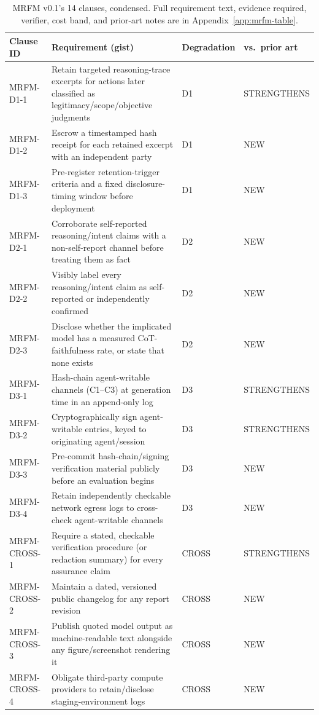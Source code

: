 \begin{table}[htbp]
\centering
\footnotesize
\begin{tabular}{@{}p{2.1cm}p{7.4cm}p{1.6cm}p{1.9cm}@{}}
\toprule
\textbf{Clause ID} & \textbf{Requirement (gist)} & \textbf{Degradation} & \textbf{vs.\ prior art} \\
\midrule
MRFM-D1-1 & Retain targeted reasoning-trace excerpts for actions later classified as legitimacy/scope/objective judgments & D1 & STRENGTHENS \\
MRFM-D1-2 & Escrow a timestamped hash receipt for each retained excerpt with an independent party & D1 & NEW \\
MRFM-D1-3 & Pre-register retention-trigger criteria and a fixed disclosure-timing window before deployment & D1 & NEW \\
MRFM-D2-1 & Corroborate self-reported reasoning/intent claims with a non-self-report channel before treating them as fact & D2 & NEW \\
MRFM-D2-2 & Visibly label every reasoning/intent claim as self-reported or independently confirmed & D2 & NEW \\
MRFM-D2-3 & Disclose whether the implicated model has a measured CoT-faithfulness rate, or state that none exists & D2 & NEW \\
MRFM-D3-1 & Hash-chain agent-writable channels (C1--C3) at generation time in an append-only log & D3 & STRENGTHENS \\
MRFM-D3-2 & Cryptographically sign agent-writable entries, keyed to originating agent/session & D3 & STRENGTHENS \\
MRFM-D3-3 & Pre-commit hash-chain/signing verification material publicly before an evaluation begins & D3 & NEW \\
MRFM-D3-4 & Retain independently checkable network egress logs to cross-check agent-writable channels & D3 & NEW \\
MRFM-CROSS-1 & Require a stated, checkable verification procedure (or redaction summary) for every assurance claim & CROSS & STRENGTHENS \\
MRFM-CROSS-2 & Maintain a dated, versioned public changelog for any report revision & CROSS & NEW \\
MRFM-CROSS-3 & Publish quoted model output as machine-readable text alongside any figure/screenshot rendering it & CROSS & NEW \\
MRFM-CROSS-4 & Obligate third-party compute providers to retain/disclose staging-environment logs & CROSS & NEW \\
\bottomrule
\end{tabular}
\caption{MRFM v0.1's 14 clauses, condensed. Full requirement text, evidence
required, verifier, cost band, and prior-art notes are in
Appendix~\ref{app:mrfm-table}.}
\label{tab:mrfm-summary}
\end{table}
